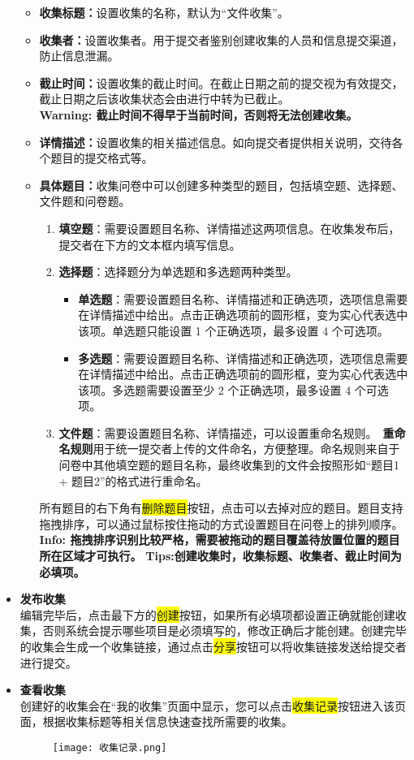\documentclass[lang=cn,11pt,a4paper]{elegantpaper}
\newcommand{\hlc}[2][yellow]{\colorbox{#1}{#2}} %
\begin{document}
\begin{itemize}
	\begin{itemize}
		\item {\bf 收集标题：}设置收集的名称，默认为“文件收集”。
		\item {\bf 收集者：}设置收集者。用于提交者鉴别创建收集的人员和信息提交渠道，防止信息泄漏。
		\item {\bf 截止时间：}设置收集的截止时间。在截止日期之前的提交视为有效提交，截止日期之后该收集状态会由进行中转为已截止。\\
		{\bf Warning: 截止时间不得早于当前时间，否则将无法创建收集。}
		\item {\bf 详情描述：}设置收集的相关描述信息。如向提交者提供相关说明，交待各个题目的提交格式等。
		\item {\bf 具体题目：}收集问卷中可以创建多种类型的题目，包括填空题、选择题、文件题和问卷题。
		\begin{enumerate}
			\item {\bf 填空题}：需要设置题目名称、详情描述这两项信息。在收集发布后，提交者在下方的文本框内填写信息。
			\item {\bf 选择题}：选择题分为单选题和多选题两种类型。
			\begin{itemize}
				\item {\bf 单选题}：需要设置题目名称、详情描述和正确选项，选项信息需要在详情描述中给出。点击正确选项前的圆形框，变为实心代表选中该项。单选题只能设置 1 个正确选项，最多设置 4 个可选项。
				\item {\bf 多选题}：需要设置题目名称、详情描述和正确选项，选项信息需要在详情描述中给出。点击正确选项前的圆形框，变为实心代表选中该项。多选题需要设置至少 2 个正确选项，最多设置 4 个可选项。
			\end{itemize}
			\item {\bf 文件题}：需要设置题目名称、详情描述，可以设置重命名规则。\
			{\bf 重命名规则}用于统一提交者上传的文件命名，方便整理。命名规则来自于问卷中其他填空题的题目名称，最终收集到的文件会按照形如“题目1 + 题目2”的格式进行重命名。
		\end{enumerate}
		所有题目的右下角有\hlc{删除题目}按钮，点击可以去掉对应的题目。题目支持拖拽排序，可以通过鼠标按住拖动的方式设置题目在问卷上的排列顺序。\\
		{\bf Info: 拖拽排序识别比较严格，需要被拖动的题目覆盖待放置位置的题目所在区域才可执行。}
	{\bf Tips:创建收集时，收集标题、收集者、截止时间为必填项。	}
	\end{itemize}
	\item {\bf 发布收集}\\
	编辑完毕后，点击最下方的\hlc{创建}按钮，如果所有必填项都设置正确就能创建收集，否则系统会提示哪些项目是必须填写的，修改正确后才能创建。创建完毕的收集会生成一个收集链接，通过点击\hlc{分享}按钮可以将收集链接发送给提交者进行提交。\
	\item {\bf 查看收集}\\
	创建好的收集会在“我的收集”页面中显示，您可以点击\hlc{收集记录}按钮进入该页面，根据收集标题等相关信息快速查找所需要的收集。
	\clearpage
		\begin{figure}[!htb]
		\centering
		\texttt{[image: 收集记录.png]}
	\end{figure}
	

\end{itemize}
\end{document}
